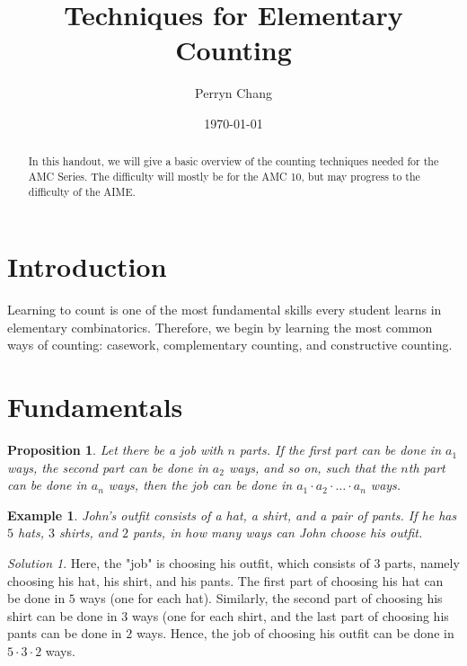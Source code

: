 \documentclass[letterpaper]{article}
\title{Techniques for Elementary Counting}
\author{Perryn Chang}
\date{\today}
\newtheorem{prop}[thm]{Proposition}
\newtheorem{example}[thm]{Example}
\theoremstyle{remark}
\newtheorem*{solution}{Solution}
\theoremstyle{definition}
\begin{document}
\maketitle

\begin{abstract}
In this handout, we will give a basic overview of the counting techniques needed for the AMC Series. The difficulty will mostly be for the AMC 10, but may progress to the difficulty of the AIME.
\end{abstract}

\section{Introduction}

Learning to count is one of the most fundamental skills every student learns in elementary combinatorics. Therefore, we begin by learning the most common ways of counting: casework, complementary counting, and constructive counting.

\section{Fundamentals}
\label{sec:examples}

\begin{prop}
Let there be a job with $n$ parts. If the first part can be done in $a_1$ ways, the second part can be done in $a_2$ ways, and so on, such that the $n$th part can be done in $a_n$ ways, then the job can be done in $a_1 \cdot a_2 \cdot \dots \cdot a_n$ ways.

\end{prop}

\begin{example}

John's outfit consists of a hat, a shirt, and a pair of pants. If he has $5$ hats, $3$ shirts, and $2$ pants, in how many ways can John choose his outfit.

\end{example}

\begin{solution}

Here, the "job" is choosing his outfit, which consists of $3$ parts, namely choosing his hat, his shirt, and his pants. The first part of choosing his hat can be done in $5$ ways (one for each hat). Similarly, the second part of choosing his shirt can be done in $3$ ways (one for each shirt, and the last part of choosing his pants can be done in $2$ ways. Hence, the job of choosing his outfit can be done in $5\cdot 3 \cdot 2$ ways.
\end{solution}
\end{document}
